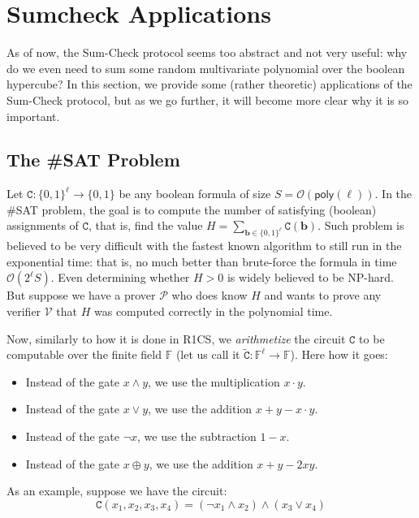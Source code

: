 \documentclass{gkr-template}
\begin{document}
\section*{Sumcheck Applications}

As of now, the Sum-Check protocol seems too abstract and not very useful: why do
we even need to sum some random multivariate polynomial over the boolean
hypercube? In this section, we provide some (rather theoretic) applications of
the Sum-Check protocol, but as we go further, it will become more clear why it
is so important.

\subsection*{The \#SAT Problem}

Let $\mathtt{C}: \{0,1\}^{\ell} \to \{0,1\}$ be any boolean formula of size $S =
\mathcal{O}(\mathsf{poly}(\ell))$. In the \#SAT problem, the goal is to compute
the number of satisfying (boolean) assignments of $\mathtt{C}$, that is, find
the value $H = \sum_{\boldsymbol{b} \in
\{0,1\}^{\ell}}\mathtt{C}(\boldsymbol{b})$. Such problem is believed to be very
difficult with the fastest known algorithm to still run in the exponential time:
that is, no much better than brute-force the formula in time
$\mathcal{O}(2^{\ell}S)$. Even determining whether $H > 0$ is widely believed to
be NP-hard. But suppose we have a prover $\mathcal{P}$ who does know $H$ and
wants to prove any verifier $\mathcal{V}$ that $H$ was computed correctly in the
polynomial time.

Now, similarly to how it is done in R1CS, we \textit{arithmetize} the circuit
$\mathtt{C}$ to be computable over the finite field $\mathbb{F}$ (let us call it
$\widetilde{\mathtt{C}}: \mathbb{F}^{\ell} \to \mathbb{F}$). Here how it goes:
\begin{itemize}
    \item Instead of the gate $x \wedge y$, we use the multiplication $x \cdot y$.
    \item Instead of the gate $x \vee y$, we use the addition $x + y - x \cdot y$.
    \item Instead of the gate $\neg x$, we use the subtraction $1 - x$.
    \item Instead of the gate $x \oplus y$, we use the addition $x + y - 2xy$.
\end{itemize}

As an example, suppose we have the circuit:
\begin{equation*}
    \mathtt{C}(x_1,x_2,x_3,x_4) = (\neg x_1 \wedge x_2) \wedge (x_3 \vee x_4)
\end{equation*}
\end{document}
